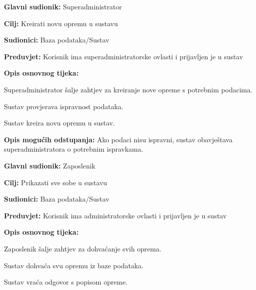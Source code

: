 \noindent {}
\begin{packed_item}
	
	\item \textbf{Glavni sudionik: }Superadministrator
	\item  \textbf{Cilj:} Kreirati novu opremu u sustavu
	\item  \textbf{Sudionici:} Baza podataka/Sustav
	\item  \textbf{Preduvjet:} Korisnik ima superadministratorske ovlasti i prijavljen je u sustav
	\item  \textbf{Opis osnovnog tijeka:}
	
	\item[] \begin{packed_enum}
		
		\item Superadministrator šalje zahtjev za kreiranje nove opreme s potrebnim podacima.
		\item Sustav provjerava ispravnost podataka.
		\item Sustav kreira novu opremu u sustav.
		
	\end{packed_enum}
	
	\item  \textbf{Opis mogućih odstupanja:} Ako podaci nisu ispravni, sustav obavještava superadministratora o potrebnim ispravkama.
	
	
\end{packed_item}

\noindent {}
\begin{packed_item}
	
	\item \textbf{Glavni sudionik: }Zaposlenik
	\item  \textbf{Cilj:} Prikazati sve sobe u sustavu
	\item  \textbf{Sudionici:} Baza podataka/Sustav
	\item  \textbf{Preduvjet:} Korisnik ima administratorske ovlasti i prijavljen je u sustav
	\item  \textbf{Opis osnovnog tijeka:}
	
	\item[] \begin{packed_enum}
		
		\item Zaposlenik šalje zahtjev za dohvaćanje svih oprema.
		\item Sustav dohvaća svu opremu iz baze podataka.
		\item Sustav vraća odgovor s popisom opreme.
		
	\end{packed_enum}
	
\end{packed_item}

